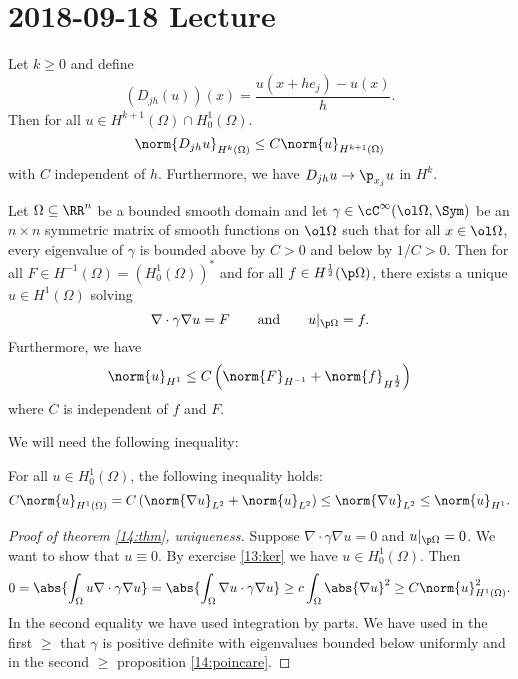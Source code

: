 \section{2018-09-18 Lecture}

\begin{exer}
  Let $k\geq0$ and define
  \[ \left(D_{jh}(u)\right)(x) = \frac{u(x+he_j)-u(x)}{h}. \]
  Then for all $u\in H^{k+1}(\Omega) \cap H_0^1(\Omega)$.
  \[ \norm{D_{jh}u}_{H^k(\Omega)} \leq C\norm{u}_{H^{k+1}(\Omega)} \]
  with $C$ independent of $h$.
  Furthermore, we have $D_{jh}u \to \p_{x_j}u$ in $H^k$.
\end{exer}

\begin{thm}\label{14:thm}
  Let $\Omega\subseteq\RR^n$ be a bounded smooth domain and let $\gamma\in\cC^\infty(\ol\Omega,\Sym)$ be an $n\times n$ symmetric matrix of smooth functions on $\ol\Omega$ such that for all $x\in\ol\Omega$, every eigenvalue of $\gamma$ is bounded above by $C>0$ and below by $1/C>0$.
  Then for all $F \in H^{-1}(\Omega)=(H_0^1(\Omega))^*$ and for all $f\in H^\frac12(\p\Omega)$, there exists a unique $u\in H^1(\Omega)$ solving
  \[ \nabla\cdot\gamma\nabla u=F \qquad \text{and} \qquad u|_{\p\Omega}=f. \]
  Furthermore, we have
  \[ \norm{u}_{H^1} \leq C\left( \norm{F}_{H^{-1}} + \norm{f}_{H^\frac12} \right) \]
  where $C$ is independent of $f$ and $F$.
\end{thm}

We will need the following inequality:

\begin{prop}\label{14:poincare}
  For all $u \in H_0^1(\Omega)$, the following inequality holds:
  \[ C\norm{u}_{H^1(\Omega)} = C\left( \norm{\nabla u}_{L^2} + \norm{u}_{L^2} \right) \leq \norm{\nabla u}_{L^2} \leq \norm{u}_{H^1}. \]
\end{prop}

\begin{proof}[Proof of theorem \ref{14:thm}, uniqueness]
  Suppose $\nabla\cdot\gamma\nabla u=0$ and $u|_{\p\Omega}=0$.
  We want to show that $u\equiv0$.
  By exercise \ref{13:ker} we have $u \in H_0^1(\Omega)$.
  Then
  \[ 0 = \abs{\int_\Omega u \nabla\cdot\gamma\nabla u} = \abs{\int_\Omega \nabla u\cdot\gamma\nabla u} \geq c\int_\Omega\abs{\nabla u}^2 \geq C\norm{u}_{H^1(\Omega)}^2. \]
  In the second equality we have used integration by parts.
  We have used in the first $\geq$ that $\gamma$ is positive definite with eigenvalues bounded below uniformly and in the second $\geq$ proposition \ref{14:poincare}.
\end{proof}

